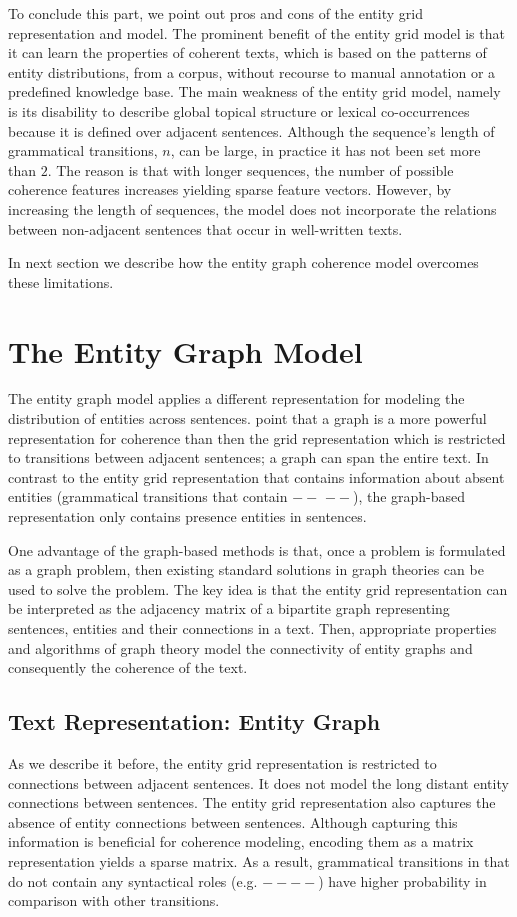 To conclude this part, we point out pros and cons of the entity grid representation and model. 
The prominent benefit of the entity grid model is that it can learn the properties of coherent texts, which is based on the patterns of entity distributions, from a corpus, without recourse to manual annotation or a predefined knowledge base.
The main weakness of the entity grid model, namely is its disability to describe global topical structure or lexical co-occurrences because it is defined over adjacent sentences. 
Although the sequence's length of grammatical transitions, $n$, can be large, in practice it has not been set more than $2$. 
The reason is that with longer sequences, the number of possible coherence features increases yielding sparse feature vectors. 
However, by increasing the length of sequences, the model does not incorporate the relations between non-adjacent sentences that occur in well-written texts. 

In next section we describe how the entity graph coherence model overcomes these limitations.


\section{The Entity Graph Model}
\label{sec:ent_graph}
%
The entity graph model applies a different representation for modeling the distribution of entities across sentences. 
 point that a graph is a more powerful representation for coherence than then the grid \cite{barzilay08} representation which is restricted to transitions between adjacent sentences; a graph can span the entire text. 
In contrast to the entity grid representation that contains information about absent entities (grammatical  transitions that contain $--$ $--$), the graph-based representation only contains presence entities in sentences. 

One advantage of the graph-based methods is that, once a problem is formulated as a graph problem, then existing standard solutions in graph theories can be used to solve the problem. 
The key idea is that the entity grid representation \cite{barzilay08} can be interpreted as the adjacency matrix of a bipartite graph representing  sentences, entities and their connections in a text. 
Then, appropriate properties and algorithms of graph theory model the connectivity of entity graphs and consequently the coherence of the text. 

\subsection{Text Representation: Entity Graph}
%
As we describe it before, the entity grid representation is restricted to connections between adjacent sentences. 
It does not model the long distant entity connections between sentences. 
The entity grid representation also captures the absence of entity connections between sentences. 
Although capturing this information is beneficial for coherence modeling, encoding them as a matrix representation yields a sparse matrix. 
As a result, grammatical transitions in that do not contain any syntactical roles (e.g. $-- --$) have higher probability in comparison with other transitions. 

